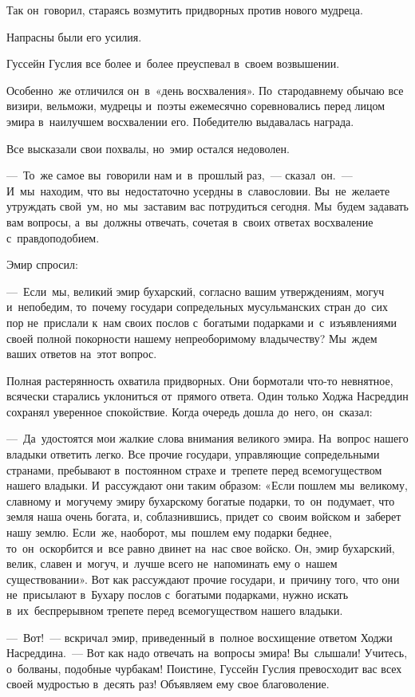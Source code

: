 \documentclass[12pt,a4paper]{book}
\begin{document}
Так он~говорил, стараясь возмутить придворных против нового мудреца.

Напрасны были его усилия.

Гуссейн Гуслия все более и~более преуспевал в~своем возвышении.

Особенно~же отличился он~в~«день восхваления». По~стародавнему обычаю все визири, вельможи, мудрецы и~поэты ежемесячно соревновались перед лицом эмира в~наилучшем восхвалении его. Победителю выдавалась награда.

Все высказали свои похвалы, но~эмир остался недоволен.

—~То~же самое вы~говорили нам и~в~прошлый раз,~— сказал~он.~— И~мы~находим, что вы~недостаточно усердны в~славословии. Вы~не~желаете утруждать свой~ум, но~мы~заставим вас потрудиться сегодня. Мы~будем задавать вам вопросы, а~вы~должны отвечать, сочетая в~своих ответах восхваление с~правдоподобием.

Эмир спросил:

—~Если~мы, великий эмир бухарский, согласно вашим утверждениям, могуч и~непобедим, то~почему государи сопредельных мусульманских стран до~сих пор не~прислали к~нам своих послов с~богатыми подарками и~с~изъявлениями своей полной покорности нашему непреоборимому владычеству? Мы~ждем ваших ответов на~этот вопрос.

Полная растерянность охватила придворных. Они бормотали что-то невнятное, всячески старались уклониться от~прямого ответа. Один только Ходжа Насреддин сохранял уверенное спокойствие. Когда очередь дошла до~него, он~сказал:

—~Да~удостоятся мои жалкие слова внимания великого эмира. На~вопрос нашего владыки ответить легко. Все прочие государи, управляющие сопредельными странами, пребывают в~постоянном страхе и~трепете перед всемогуществом нашего владыки. И~рассуждают они таким образом: «Если пошлем мы~великому, славному и~могучему эмиру бухарскому богатые подарки, то~он~подумает, что земля наша очень богата, и, соблазнившись, придет со~своим войском и~заберет нашу землю. Если~же, наоборот, мы~пошлем ему подарки беднее, то~он~оскорбится и~все равно двинет на~нас свое войско. Он, эмир бухарский, велик, славен и~могуч, и~лучше всего не~напоминать ему о~нашем существовании». Вот как рассуждают прочие государи, и~причину того, что они не~присылают в~Бухару послов с~богатыми подарками, нужно искать в~их~беспрерывном трепете перед всемогуществом нашего владыки.

—~Вот!~— вскричал эмир, приведенный в~полное восхищение ответом Ходжи Насреддина.~— Вот как надо отвечать на~вопросы эмира! Вы~слышали! Учитесь, о~болваны, подобные чурбакам! Поистине, Гуссейн Гуслия превосходит вас всех своей мудростью в~десять раз! Объявляем ему свое благоволение.
\end{document}
